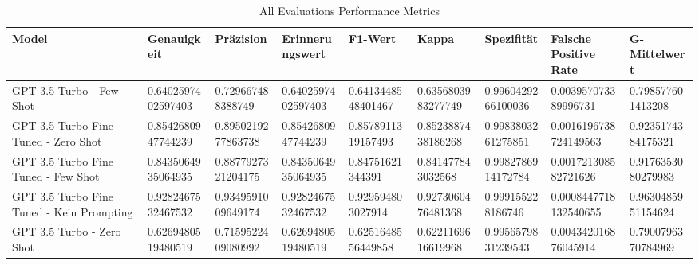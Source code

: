 
    \begin{table}[!ht]
        \centering
        \begin{tabularx}{\textwidth}{X l l l l l l l l}
\toprule
\textbf{Model} & \textbf{Genauigkeit} & \textbf{Präzision} & \textbf{Erinnerungswert} & \textbf{F1-Wert} & \textbf{Kappa} & \textbf{Spezifität} & \textbf{Falsche Positive Rate} & \textbf{G-Mittelwert} \\
\midrule
GPT 3.5 Turbo - Few Shot & \num{0.6402597402597403} & \num{0.729667488388749} & \num{0.6402597402597403} & \num{0.6413448548401467} & \num{0.6356803983277749} & \num{0.9960429266100036} & \num{0.003957073389996731} & \num{0.798577601413208} \\
GPT 3.5 Turbo Fine Tuned - Zero Shot & \num{0.8542680947744239} & \num{0.8950219277863738} & \num{0.8542680947744239} & \num{0.8578911319157493} & \num{0.8523887438186268} & \num{0.9983803261275851} & \num{0.0016196738724149563} & \num{0.9235174384175321} \\
GPT 3.5 Turbo Fine Tuned - Few Shot & \num{0.8435064935064935} & \num{0.8877927321204175} & \num{0.8435064935064935} & \num{0.84751621344391} & \num{0.841477843032568} & \num{0.9982786914172784} & \num{0.001721308582721626} & \num{0.9176353080279983} \\
GPT 3.5 Turbo Fine Tuned - Kein Prompting & \num{0.9282467532467532} & \num{0.9349591009649174} & \num{0.9282467532467532} & \num{0.929594803027914} & \num{0.9273060476481368} & \num{0.999155228186746} & \num{0.0008447718132540655} & \num{0.9630485951154624} \\
GPT 3.5 Turbo - Zero Shot & \num{0.6269480519480519} & \num{0.7159522409080992} & \num{0.6269480519480519} & \num{0.6251648556449858} & \num{0.6221169616619968} & \num{0.9956579831239543} & \num{0.004342016876045914} & \num{0.7900796370784969} \\
\bottomrule
\end{tabularx}

        \caption{All Evaluations Performance Metrics}
        \label{tab:all-evaluations-performance-metrics}
    \end{table}
    